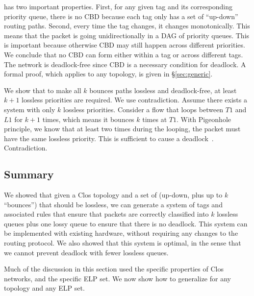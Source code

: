  \sysname{} has two
important properties. First, for any given tag and its corresponding priority
queue, there is no CBD because each tag only has a set of ``up-down'' routing
paths.  Second, every time the tag changes, it changes monotonically. This means
that the packet is going unidirectionally in a DAG of priority queues. This is
important because otherwise CBD may still happen across different priorities.
We conclude that no CBD can form either within a tag or across different tags.
The network is deadlock-free since CBD is a necessary condition for deadlock.  A
formal proof, which applies to any topology, is given in \S\ref{sec:generic}.

 We show that
to make all $k$ bounces paths lossless and deadlock-free, at least $k+1$
lossless priorities are required. We use contradiction.  Assume there exists a
system with only $k$ lossless priorities. Consider a flow that loops between
$T1$ and $L1$ for $k+1$ times, which means it bounces $k$ times at $T1$. With
Pigeonhole principle, we know that at least two times during the looping, the
packet must have the same lossless priority. This is sufficient to cause
a deadlock~\cite{hu2016deadlocks}. Contradiction.

\subsection {Summary}

We showed that given a Clos topology and a set of  (up-down, plus up to $k$
``bounces'') that should be lossless, we can generate a system of tags and
associated rules that ensure that packets are correctly classified into $k$
lossless queues plus one lossy queue to ensure that there is no deadlock.   This system can be
implemented with existing hardware, without requiring any changes to the routing
protocol. We also showed that this system is optimal, in the sense that we
cannot prevent deadlock with fewer lossless queues.

Much of the discussion in this section used the specific properties of Clos
networks, and the specific ELP set. We now show how to generalize \sysname{} for
any topology and any ELP set.
